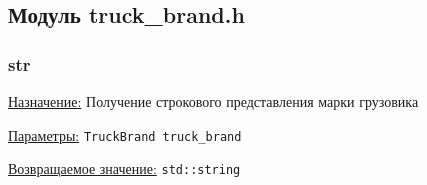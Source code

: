 \subsection{Модуль truck\_brand.h}


\subsubsection{str}

\underline{Назначение:} Получение строкового представления марки грузовика

\underline{Параметры:} \verb|TruckBrand truck_brand|

\underline{Возвращаемое значение:} \verb|std::string|

